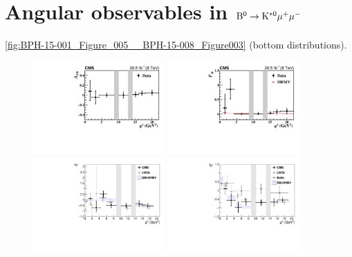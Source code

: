 \documentclass{PoS}
\begin{document}
\section{Angular observables in ${\rm B^0 \to K^{*0}\mu^+\mu^-}$}

\cite{bph-15-008}

\ref{fig:BPH-15-001_Figure_005__BPH-15-008_Figure003} (bottom distributions).


\begin{figure}[htb]
\centering
\includegraphics[width=0.45\textwidth]{figures/CMS-BPH-15-001_Figure_005-a}
\includegraphics[width=0.45\textwidth]{figures/CMS-BPH-15-001_Figure_005-b}\\
\includegraphics[width=0.45\textwidth]{figures/CMS-BPH-15-008_Figure_003-a}
\includegraphics[width=0.45\textwidth]{figures/CMS-BPH-15-008_Figure_003-b}

\end{figure}
\end{document}
